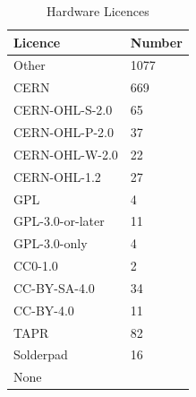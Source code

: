 \documentclass[final-report.tex]{subfiles}
\begin{document}
\begin{table}[h!]
        \centering
        \begin{tabular}{| l | l |}
        \toprule
                Licence & Number \\
        \midrule
        \midrule
            Other & 1077 \\
        \midrule
            CERN & 669 \\
            CERN-OHL-S-2.0 & 65 \\
            CERN-OHL-P-2.0 & 37 \\
            CERN-OHL-W-2.0 & 22 \\
            CERN-OHL-1.2 & 27 \\
        \midrule
            GPL & 4 \\
            GPL-3.0-or-later & 11 \\
            GPL-3.0-only & 4 \\
        \midrule
            CC0-1.0 & 2 \\
            CC-BY-SA-4.0 & 34 \\
            CC-BY-4.0 & 11 \\
        \midrule
            TAPR & 82 \\
            Solderpad & 16 \\
        \midrule
            None &  \\
        \bottomrule
        \end{tabular}
        \caption{Hardware Licences}
        \label{tab:hlic}
\end{table}
\end{document}
